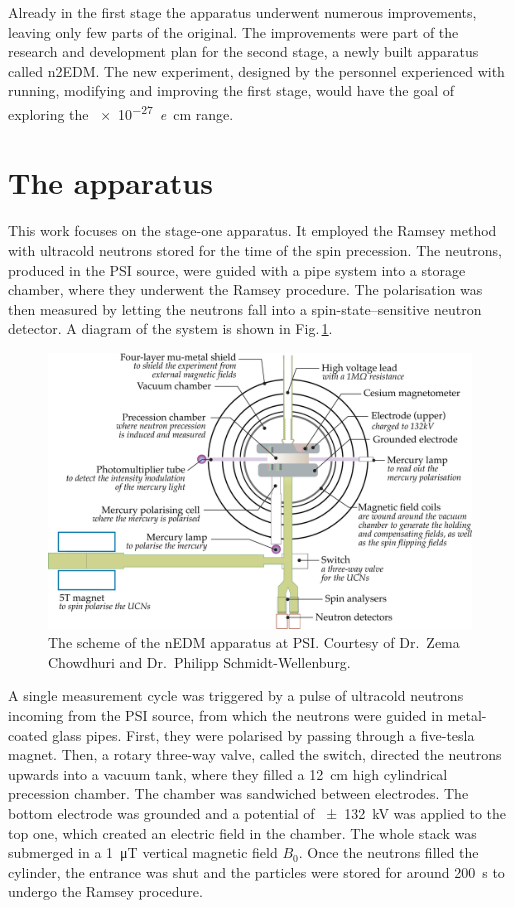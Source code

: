 Already in the first stage the apparatus underwent numerous improvements, leaving only few parts of the original.
The improvements were part of the research and development plan for the second stage, a newly built apparatus called n2EDM\@.
The new experiment, designed by the personnel experienced with running, modifying and improving the first stage, would have the goal of exploring the \SI{e-27}{\elementarycharge\centi\meter} range.




\section{The apparatus}
This work focuses on the stage-one apparatus.
It employed the Ramsey method with ultracold neutrons stored for the time of the spin precession.
The neutrons, produced in the PSI source, were guided with a pipe system into a storage chamber, where they underwent the Ramsey procedure.
The polarisation was then measured by letting the neutrons fall into a spin-state--sensitive neutron detector.
A diagram of the system is shown in Fig.\,\ref{fig:nEDM_scheme}.

\begin{figure}
  \centering
  \includegraphics[width=\linewidth]{gfx/nEDMatPSI/apparatus_palatino.pdf}
  \caption{The scheme of the nEDM apparatus at PSI\@. Courtesy of Dr.\ Zema Chowdhuri and Dr.\ Philipp Schmidt-Wellenburg.}\label{fig:nEDM_scheme}
\end{figure}

A single measurement cycle was triggered by a pulse of ultracold neutrons incoming from the PSI source, from which the neutrons were guided in metal-coated glass pipes.
First, they were polarised by passing through a five-tesla magnet.
Then, a rotary three-way valve, called the switch, directed the neutrons upwards into a vacuum tank, where they filled a \SI{12}{\centi\meter} high cylindrical precession chamber.
The chamber was sandwiched between electrodes. The bottom electrode was grounded and a potential of \SI{\pm 132}{\kilo\volt} was applied to the top one, which created an electric field in the chamber.
The whole stack was submerged in a \SI{1}{\micro\tesla} vertical magnetic field $B_0$.
Once the neutrons filled the cylinder, the entrance was shut and the particles were stored for around \SI{200}{\second} to undergo the Ramsey procedure.

